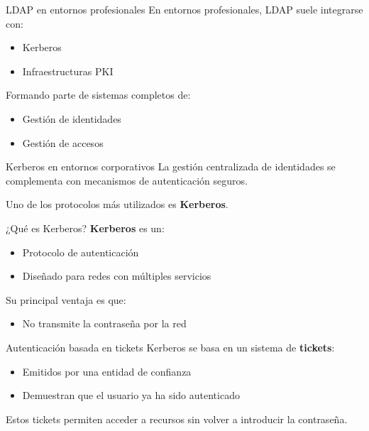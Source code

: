 \documentclass{beamer}
\begin{document}
\begin{frame}{LDAP en entornos profesionales}
En entornos profesionales, LDAP suele integrarse con:
\begin{itemize}
    \item Kerberos
    \item Infraestructuras PKI
\end{itemize}

\vspace{0.3cm}
Formando parte de sistemas completos de:
\begin{itemize}
    \item Gestión de identidades
    \item Gestión de accesos
\end{itemize}
\end{frame}

\begin{frame}{Kerberos en entornos corporativos}
La gestión centralizada de identidades se complementa con mecanismos de autenticación seguros.

\vspace{0.3cm}
Uno de los protocolos más utilizados es \textbf{Kerberos}.
\end{frame}

\begin{frame}{¿Qué es Kerberos?}
\textbf{Kerberos} es un:
\begin{itemize}
    \item Protocolo de autenticación
    \item Diseñado para redes con múltiples servicios
\end{itemize}

\vspace{0.3cm}
Su principal ventaja es que:
\begin{itemize}
    \item No transmite la contraseña por la red
\end{itemize}
\end{frame}

\begin{frame}{Autenticación basada en tickets}
Kerberos se basa en un sistema de \textbf{tickets}:
\begin{itemize}
    \item Emitidos por una entidad de confianza
    \item Demuestran que el usuario ya ha sido autenticado
\end{itemize}

\vspace{0.3cm}
Estos tickets permiten acceder a recursos sin volver a introducir la contraseña.
\end{frame}
\end{document}
